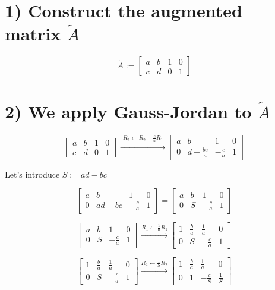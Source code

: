 \section{1) Construct the augmented matrix \(\widetilde{A}\)}
\[\widetilde{A} := \begin{bmatrix}
a & b & 1 & 0 \\
c & d & 0 & 1
\end{bmatrix}\]

\section{2) We apply Gauss-Jordan to \(\widetilde{A}\)}
\[\begin{bmatrix}
a & b & 1 & 0 \\
c & d & 0 & 1
\end{bmatrix} \xrightarrow{\substack{R_2 \leftarrow R_2 - \frac{c}{a}R_1}}
\begin{bmatrix}
a & b & 1 & 0 \\
0 & d-\frac{bc}{a} & -\frac{c}{a} & 1
\end{bmatrix}\]

Let's introduce \(S := ad - bc\)

\[\begin{bmatrix}
a & b & 1 & 0 \\
0 & ad-bc & -\frac{c}{a} & 1
\end{bmatrix} = \begin{bmatrix}
a & b & 1 & 0 \\
0 & S & -\frac{c}{a} & 1
\end{bmatrix}\]

\[\begin{bmatrix}
a & b & 1 & 0 \\
0 & S & -\frac{c}{a} & 1
\end{bmatrix} \xrightarrow{R_1 \leftarrow \frac{1}{a}R_1}
\begin{bmatrix}
1 & \frac{b}{a} & \frac{1}{a} & 0 \\
0 & S & -\frac{c}{a} & 1
\end{bmatrix}\]

\[\begin{bmatrix}
1 & \frac{b}{a} & \frac{1}{a} & 0 \\
0 & S & -\frac{c}{a} & 1
\end{bmatrix} \xrightarrow{R_2 \leftarrow \frac{1}{S}R_2}
\begin{bmatrix}
1 & \frac{b}{a} & \frac{1}{a} & 0 \\
0 & 1 & -\frac{c}{S} & \frac{1}{S}
\end{bmatrix}\]

